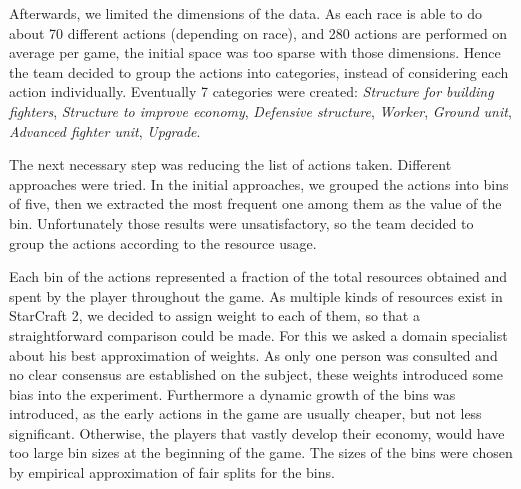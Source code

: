 \documentclass[a4paper,11pt]{article}
\begin{document}
Afterwards, we limited the dimensions of the data. As each race is able to do about 70 different actions (depending on race), and 280 actions are performed on average per game, the initial space was too sparse with those dimensions. Hence the team decided to group the actions into categories, instead of considering each action individually. Eventually 7 categories were created: \textit{Structure for building fighters}, \textit{Structure to improve economy}, \textit{Defensive structure}, \textit{Worker}, \textit{Ground unit}, \textit{Advanced fighter unit}, \textit{Upgrade}.

The next necessary step was reducing the list of actions taken. Different approaches were tried. In the initial approaches, we grouped the actions into bins of five, then we extracted the most frequent one among them as the value of the bin. Unfortunately those results were unsatisfactory, so the team decided to group the actions according to the resource usage. 

Each bin of the actions represented a fraction of the total resources obtained and spent by the player throughout the game.
As multiple kinds of resources exist in StarCraft 2, we decided to assign weight to each of them, so that a straightforward comparison could be made. For this we asked a domain specialist about his best approximation of weights.
As only one person was consulted and no clear consensus are established on the subject, these weights introduced some bias into the experiment.
Furthermore a dynamic growth of the bins was introduced, as the early actions in the game are usually cheaper, but not less significant. Otherwise, the players that vastly develop their economy, would have too large bin sizes at the beginning of the game. The sizes of the bins were chosen by empirical approximation of fair splits for the bins.
\end{document}
